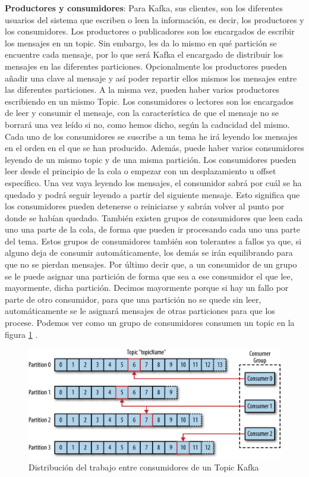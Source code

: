 \textbf{Productores y consumidores}: Para Kafka, sus clientes, son los diferentes usuarios del sistema que escriben o leen la información, es decir, los productores y los consumidores. Los productores o publicadores son los encargados de escribir los mensajes en un topic. Sin embargo, les da lo mismo en qué partición se encuentre cada mensaje, por lo que será Kafka el encargado de distribuir los mensajes en las diferentes particiones. Opcionalmente los productores pueden añadir una clave al mensaje y así poder repartir ellos mismos los mensajes entre las diferentes particiones. A la misma vez, pueden haber varios productores escribiendo en un mismo Topic. Los consumidores o lectores son los encargados de leer y consumir el mensaje, con la característica de que el mensaje no se borrará una vez leído si no, como hemos dicho, según la caducidad del mismo. Cada uno de los consumidores se suscribe a un tema he irá leyendo los mensajes en el orden en el que se han producido. Además, puede haber varios consumidores leyendo de un mismo topic y de una misma partición. Los consumidores pueden leer desde el principio de la cola o empezar con un desplazamiento u offset específico. Una vez vaya leyendo los mensajes, el consumidor sabrá por cuál se ha quedado y podrá seguir leyendo a partir del siguiente mensaje. Esto significa que los consumidores pueden detenerse o reiniciarse y sabrán volver al punto por donde se habían quedado. También existen grupos de consumidores que leen cada uno una parte de la cola, de forma que pueden ir procesando cada uno una parte del tema. Estos grupos de consumidores también son tolerantes a fallos ya que, si alguno deja de consumir automáticamente, los demás se irán equilibrando para que no se pierdan mensajes. Por último decir que, a un consumidor de un grupo se le puede asignar una partición de forma que sea a ese consumidor el que lee, mayormente, dicha partición. Decimos mayormente porque si hay un fallo por parte de otro consumidor, para que una partición no se quede sin leer, automáticamente se le asignará mensajes de otras particiones para que los procese. Podemos ver como un grupo de consumidores consumen un topic en la figura \ref{Kfk-img-2} \cite{Kfk-1}.

\begin{figure}[htp]
\centering
\includegraphics[scale=0.30]{Imagenes/kafka2.png}
\caption{Distribución del trabajo entre consumidores de un Topic Kafka}
\label{Kfk-img-2}
\end{figure}

